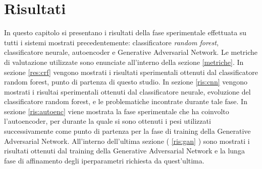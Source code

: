 \chapter{Risultati}
\label{risultati}
In questo capitolo si presentano i risultati della fase sperimentale effettuata su tutti i sistemi mostrati precedentemente: classificatore \textit{random forest}, classificatore neurale, autoencoder e Generative Adversarial Network. Le metriche di valutazione utilizzate sono enunciate all'interno della sezione \ref{metriche}. In sezione \ref{res:crf} vengono mostrati i risultati sperimentali ottenuti dal classificatore random forest, punto di partenza di questo studio. In sezione \ref{ris:cnn} vengono mostrati i risultai sperimentali ottenuti dal classificatore neurale, evoluzione del classificatore random forest, e le problematiche incontrate durante tale fase. In sezione \ref{ris:autoenc} viene mostrata la fase sperimentale che ha coinvolto l'autoencoder, per durante la quale si sono ottenuti i pesi utilizzati successivamente come punto di partenza per la fase di training della Generative Adversarial Network. All'interno dell'ultima sezione ( \ref{ris:gan} ) sono mostrati i risultati ottenuti dal training della Generative Adversarial Network e la lunga fase di affinamento degli iperparametri richiesta da quest'ultima.

\pagebreak
